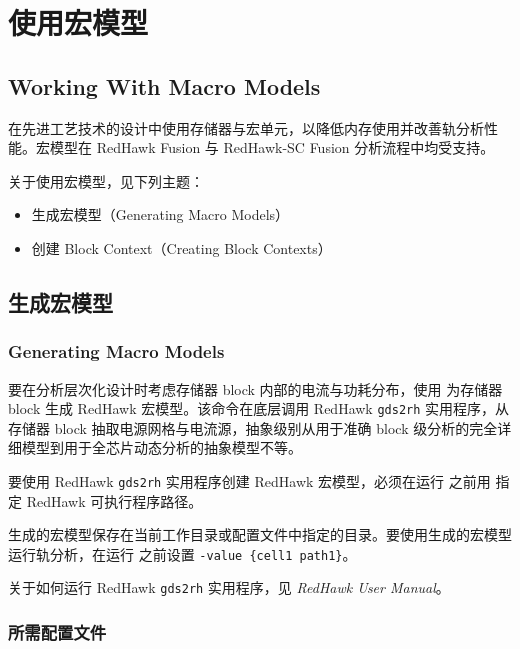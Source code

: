 \section{使用宏模型}
\subsection*{Working With Macro Models}

在先进工艺技术的设计中使用存储器与宏单元，以降低内存使用并改善轨分析性能。宏模型在 RedHawk Fusion 与 RedHawk-SC Fusion 分析流程中均受支持。

关于使用宏模型，见下列主题：
\begin{itemize}
  \item 生成宏模型（Generating Macro Models）
  \item 创建 Block Context（Creating Block Contexts）
\end{itemize}

\subsection{生成宏模型}
\subsubsection*{Generating Macro Models}

要在分析层次化设计时考虑存储器 block 内部的电流与功耗分布，使用  为存储器 block 生成 RedHawk 宏模型。该命令在底层调用 RedHawk \texttt{gds2rh} 实用程序，从存储器 block 抽取电源网格与电流源，抽象级别从用于准确 block 级分析的完全详细模型到用于全芯片动态分析的抽象模型不等。

\begin{noteBox}
要使用 RedHawk \texttt{gds2rh} 实用程序创建 RedHawk 宏模型，必须在运行  之前用  指定 RedHawk 可执行程序路径。
\end{noteBox}

生成的宏模型保存在当前工作目录或配置文件中指定的目录。要使用生成的宏模型运行轨分析，在运行  之前设置  \texttt{-value \{cell1 path1\}}。

关于如何运行 RedHawk \texttt{gds2rh} 实用程序，见 \textit{RedHawk User Manual}。

\subsubsection{所需配置文件}

